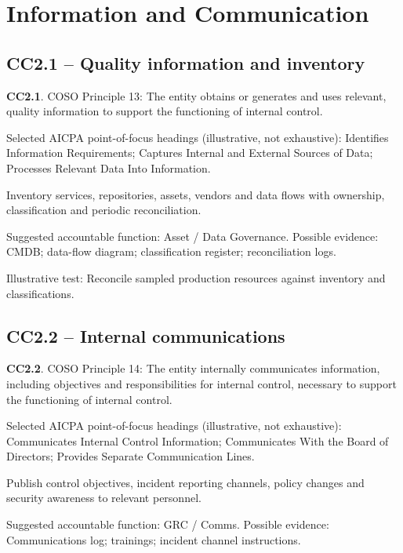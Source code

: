 \documentclass[10pt,oneside]{report}
\begin{document}
\section{Information and Communication}
\subsection*{CC2.1 -- Quality information and inventory}
\begin{aicpabox}
\textbf{CC2.1}. COSO Principle 13: The entity obtains or generates and uses relevant, quality information to support the functioning of internal control.\par{}
\end{aicpabox}
Selected AICPA point-of-focus headings (illustrative, not exhaustive): Identifies Information Requirements; Captures Internal and External Sources of Data; Processes Relevant Data Into Information.

\begin{engineeringbox}
Inventory services, repositories, assets, vendors and data flows with ownership, classification and periodic reconciliation.
\end{engineeringbox}
Suggested accountable function: Asset / Data Governance. Possible evidence: CMDB; data-flow diagram; classification register; reconciliation logs.

Illustrative test: Reconcile sampled production resources against inventory and classifications.

\subsection*{CC2.2 -- Internal communications}
\begin{aicpabox}
\textbf{CC2.2}. COSO Principle 14: The entity internally communicates information, including objectives and responsibilities for internal control, necessary to support the functioning of internal control.\par{}
\end{aicpabox}
Selected AICPA point-of-focus headings (illustrative, not exhaustive): Communicates Internal Control Information; Communicates With the Board of Directors; Provides Separate Communication Lines.

\begin{engineeringbox}
Publish control objectives, incident reporting channels, policy changes and security awareness to relevant personnel.
\end{engineeringbox}
Suggested accountable function: GRC / Comms. Possible evidence: Communications log; trainings; incident channel instructions.
\end{document}
